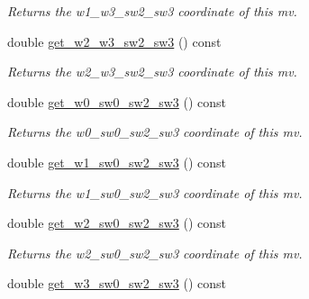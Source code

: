 \begin{DoxyCompactItemize}
\begin{DoxyCompactList}\small\item\em Returns the w1\-\_\-w3\-\_\-sw2\-\_\-sw3 coordinate of this mv. \end{DoxyCompactList}\item 
\hypertarget{classe3ga_1_1mv_a21a22e366c8e6394c0cc69eff87b248c}{double \hyperlink{classe3ga_1_1mv_a21a22e366c8e6394c0cc69eff87b248c}{get\-\_\-w2\-\_\-w3\-\_\-sw2\-\_\-sw3} () const }\label{classe3ga_1_1mv_a21a22e366c8e6394c0cc69eff87b248c}

\begin{DoxyCompactList}\small\item\em Returns the w2\-\_\-w3\-\_\-sw2\-\_\-sw3 coordinate of this mv. \end{DoxyCompactList}\item 
\hypertarget{classe3ga_1_1mv_ab9684a223b1de8cd2f2df7c6189e394c}{double \hyperlink{classe3ga_1_1mv_ab9684a223b1de8cd2f2df7c6189e394c}{get\-\_\-w0\-\_\-sw0\-\_\-sw2\-\_\-sw3} () const }\label{classe3ga_1_1mv_ab9684a223b1de8cd2f2df7c6189e394c}

\begin{DoxyCompactList}\small\item\em Returns the w0\-\_\-sw0\-\_\-sw2\-\_\-sw3 coordinate of this mv. \end{DoxyCompactList}\item 
\hypertarget{classe3ga_1_1mv_a3ea722bf8adbdfcc7f9fc31c1d308ccc}{double \hyperlink{classe3ga_1_1mv_a3ea722bf8adbdfcc7f9fc31c1d308ccc}{get\-\_\-w1\-\_\-sw0\-\_\-sw2\-\_\-sw3} () const }\label{classe3ga_1_1mv_a3ea722bf8adbdfcc7f9fc31c1d308ccc}

\begin{DoxyCompactList}\small\item\em Returns the w1\-\_\-sw0\-\_\-sw2\-\_\-sw3 coordinate of this mv. \end{DoxyCompactList}\item 
\hypertarget{classe3ga_1_1mv_ad31280d1b2ffbb4b893e72c8f0ca9414}{double \hyperlink{classe3ga_1_1mv_ad31280d1b2ffbb4b893e72c8f0ca9414}{get\-\_\-w2\-\_\-sw0\-\_\-sw2\-\_\-sw3} () const }\label{classe3ga_1_1mv_ad31280d1b2ffbb4b893e72c8f0ca9414}

\begin{DoxyCompactList}\small\item\em Returns the w2\-\_\-sw0\-\_\-sw2\-\_\-sw3 coordinate of this mv. \end{DoxyCompactList}\item 
\hypertarget{classe3ga_1_1mv_a292be426e034ba171ca251a074377085}{double \hyperlink{classe3ga_1_1mv_a292be426e034ba171ca251a074377085}{get\-\_\-w3\-\_\-sw0\-\_\-sw2\-\_\-sw3} () const }\label{classe3ga_1_1mv_a292be426e034ba171ca251a074377085}


\end{DoxyCompactItemize}
